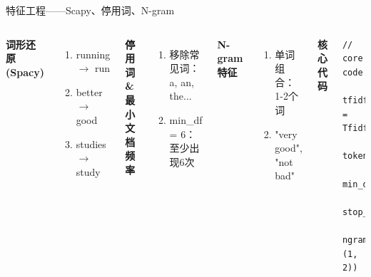 \documentclass{beamer}
\begin{document}
\begin{frame}[fragile]{特征工程——Scapy、停用词、N-gram}
    \begin{columns}
        \textbf{词形还原 (Spacy)}
        \begin{enumerate}
            \item running $\rightarrow$ run
            \item better $\rightarrow$ good
            \item studies $\rightarrow$ study
        \end{enumerate}
        \vspace{0.5cm}
        \textbf{停用词 \& 最小文档频率}
        \begin{enumerate}
            \item 移除常见词：a, an, the...
            \item min\_df = 6：至少出现6次
        \end{enumerate}

        \textbf{N-gram特征}
        \begin{enumerate}
            \item 单词组合：1-2个词
            \item "very good", "not bad"
        \end{enumerate}

        \vspace{0.7cm}
        \textbf{核心代码}
        \begin{lstlisting}[style=pythonstyle, basicstyle=\tiny]
        // core code
        tfidf_spacy = TfidfVectorizer(
            tokenizer=tokenizer_spacy,
            min_df=6,
            stop_words="english",
            ngram_range=(1, 2))
        \end{lstlisting}
    \end{columns}
\end{frame}
\end{document}
